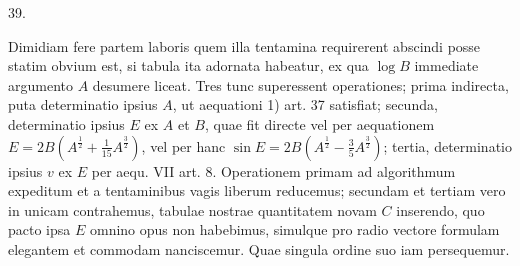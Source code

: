\begin{center}
\hypertarget{native-057-article039}{}39.
\end{center}
Dimidiam fere partem laboris quem illa tentamina requirerent abscindi posse statim obvium est, si tabula ita adornata habeatur, ex qua $\log B$ immediate argumento $A$ desumere liceat. Tres tunc superessent operationes; prima indirecta, puta determinatio ipsius $A$, ut aequationi 1) art. 37 satisfiat; secunda, determinatio ipsius $E$ ex $A$ et $B$, quae fit directe vel per aequationem $E=2B(A^{\frac{1}{2}}+\tfrac{1}{15}A^{\frac{3}{2}})$, vel per hanc $\sin E=2B(A^{\frac{1}{2}}-\tfrac{3}{5}A^{\frac{3}{2}})$; tertia, determinatio ipsius $v$ ex $E$ per aequ. VII art. 8. Operationem primam ad algorithmum expeditum et a tentaminibus vagis liberum reducemus; secundam et tertiam vero in unicam contrahemus, tabulae nostrae quantitatem novam $C$ inserendo, quo pacto ipsa $E$ omnino opus non habebimus, simulque pro radio vectore formulam elegantem et commodam nanciscemur. Quae singula ordine suo iam persequemur.

